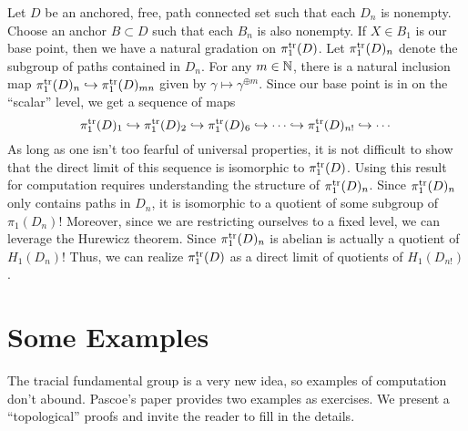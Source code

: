 Let \(D\) be an anchored, free, path connected set such that each \(D_n\) is
nonempty. Choose an anchor \(B \subset D\) such that each \(B_n\) is also
nonempty. If \(X \in B_1\) is our base point, then we have a natural gradation
on \(\pi_1^{\operatorname{tr}}(D)\). Let \(\pi_1^{\operatorname{tr}}(D)_n\) denote the subgroup of paths
contained in \(D_n\). For any \(m \in \mathbb{N} \), there is a natural inclusion map
\(\pi_1^{\operatorname{tr}}(D)_n \hookrightarrow \pi_1^{\operatorname{tr}}(D)_{mn}\) given by
\(\gamma\mapsto \gamma^{\oplus m}\). Since our base point is in on the
``scalar'' level, we get a sequence of maps
\[
  \pi_1^{\operatorname{tr}}(D)_1 \hookrightarrow
  \pi_1^{\operatorname{tr}}(D)_2 \hookrightarrow
  \pi_1^{\operatorname{tr}}(D)_6 \hookrightarrow \cdots \hookrightarrow
  \pi_1^{\operatorname{tr}}(D)_{n!} \hookrightarrow \cdots
\]
As long as one isn't too fearful of universal properties, it is not difficult to
show that the direct limit of this sequence is isomorphic to \(\pi_1^{\operatorname{tr}}(D)\).
Using this result for computation requires understanding the structure of
\(\pi_1^{\operatorname{tr}}(D)_n\). Since \(\pi_1^{\operatorname{tr}}(D)_n\) only contains paths in \(D_n\),
it is isomorphic to a quotient of some subgroup of \(\pi_1(D_n)\)! Moreover,
since we are restricting ourselves to a fixed level, we can leverage the
Hurewicz theorem. Since \(\pi_1^{\operatorname{tr}}(D)_n\) is abelian is actually a quotient
of \(H_1(D_n)\)! Thus, we can realize \(\pi_1^{\operatorname{tr}}(D)\) as a direct limit of
quotients of \(H_1(D_{n!})\).

\section{Some Examples}%
\label{sec:examples}

The tracial fundamental group is a very new idea, so examples of computation
don't abound. Pascoe's paper provides two examples as exercises. We present a
``topological'' proofs and invite the reader to fill in the details.

